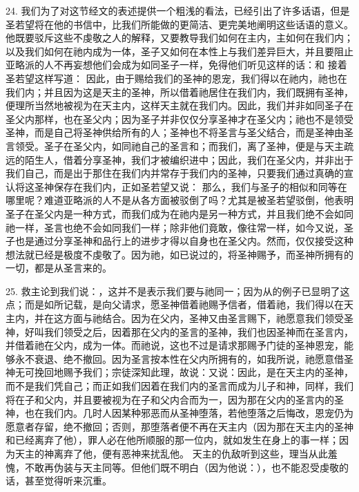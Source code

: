 24. 我们为了对这节经文的表述提供一个粗浅的看法，已经引出了许多话语，但是圣若望将在他的书信中，比我们所能做的更简洁、更完美地阐明这些话语的意义。他既要驳斥这些不虔敬之人的解释，又要教导我们如何在主内，主如何在我们内；以及我们如何在祂内成为一体，圣子又如何在本性上与我们差异巨大，并且要阻止亚略派的人不再妄想他们会成为如同圣子一样，免得他们听见这样的话：和 接着圣若望这样写道：  因此，由于赐给我们的圣神的恩宠，我们得以在祂内，祂也在我们内；并且因为这是天主的圣神，所以借着祂居住在我们内，我们既拥有圣神，便理所当然地被视为在天主内，这样天主就在我们内。因此，我们并非如同圣子在圣父内那样，也在圣父内；因为圣子并非仅仅分享圣神才在圣父内；祂也不是领受圣神，而是自己将圣神供给所有的人；圣神也不将圣言与圣父结合，而是圣神由圣言领受。圣子在圣父内，如同祂自己的圣言和；而我们，离了圣神，便是与天主疏远的陌生人，借着分享圣神，我们才被编织进中；因此，我们在圣父内，并非出于我们自己，而是出于那住在我们内并常存于我们内的圣神，只要我们通过真确的宣认将这圣神保存在我们内，正如圣若望又说：  那么，我们与圣子的相似和同等在哪里呢？难道亚略派的人不是从各方面被驳倒了吗？尤其是被圣若望驳倒，他表明圣子在圣父内是一种方式，而我们成为在祂内是另一种方式，并且我们绝不会如同祂一样，圣言也绝不会如同我们一样；除非他们竟敢，像往常一样，如今又说，圣子也是通过分享圣神和品行上的进步才得以自身也在圣父内。然而，仅仅接受这种想法就已经是极度不虔敬了。因为祂，如已说过的，将圣神赐予，而圣神所拥有的一切，都是从圣言来的。\par

25. 救主论到我们说：，这并不是表示我们要与祂同一；因为从的例子已显明了这点；而是如所记载，是向父请求，愿圣神借着祂赐予信者，借着祂，我们得以在天主内，并在这方面与祂结合。因为在父内，圣神又由圣言赐下，祂愿意我们领受圣神，好叫我们领受之后，因着那在父内的圣言的圣神，我们也因圣神而在圣言内，并借着祂在父内，成为一体。而祂说，这也不过是请求那赐予门徒的圣神恩宠，能够永不衰退、绝不撤回。因为圣言按本性在父内所拥有的，如我所说，祂愿意借圣神无可挽回地赐予我们；宗徒深知此理，故说：又说：因此，是在天主内的圣神，而不是我们凭自己；而正如我们因着在我们内的圣言而成为儿子和神，同样，我们将在子和父内，并且要被视为在子和父内合而为一，因为那在父内的圣言内的圣神，也在我们内。几时人因某种邪恶而从圣神堕落，若他堕落之后悔改，恩宠仍为愿意者存留，绝不撤回；否则，那堕落者便不再在天主内（因为那在天主内的圣神和已经离弃了他），罪人必在他所顺服的那一位内，就如发生在身上的事一样；因为天主的神离弃了他，便有恶神来扰乱他。 天主的仇敌听到这些，理当从此羞愧，不敢再伪装与天主同等。但他们既不明白（因为他说：），也不能忍受虔敬的话，甚至觉得听来沉重。\par

